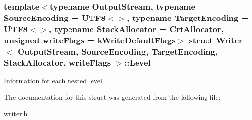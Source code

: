 \subsubsection*{template$<$typename Output\+Stream, typename Source\+Encoding = U\+T\+F8$<$$>$, typename Target\+Encoding = U\+T\+F8$<$$>$, typename Stack\+Allocator = Crt\+Allocator, unsigned write\+Flags = k\+Write\+Default\+Flags$>$\newline
struct Writer$<$ Output\+Stream, Source\+Encoding, Target\+Encoding, Stack\+Allocator, write\+Flags $>$\+::\+Level}

Information for each nested level. 

The documentation for this struct was generated from the following file\+:\begin{DoxyCompactItemize}
\item 
writer.\+h\end{DoxyCompactItemize}

